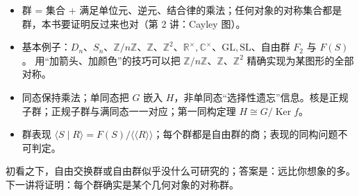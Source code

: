 \documentclass[11pt,a4paper]{article}
\theoremstyle{definition}
\theoremstyle{plain}
\theoremstyle{remark}
\newcommand{\Z}{\mathbb{Z}}
\newcommand{\R}{\mathbb{R}}
\newcommand{\C}{\mathbb{C}}
\newcommand{\GL}{\mathrm{GL}}
\newcommand{\SL}{\mathrm{SL}}
\DeclareMathOperator{\Ker}{Ker}
\begin{document}
\begin{summarybox}[本讲要点]
\begin{itemize}[nosep]
  \item 群 = 集合 + 满足单位元、逆元、结合律的乘法；任何对象的对称集合都是群，本书要证明反过来也对（第 2 讲：Cayley 图）。
  \item 基本例子：$D_n$、$S_n$、$\Z/n\Z$、$\Z$、$\Z^2$、$\R^\times,\C^\times$、$\GL,\SL$、自由群 $F_2$ 与 $F(S)$。
        用“加箭头、加颜色”的技巧可以把 $\Z/n\Z$、$\Z$、$\Z^2$ 精确实现为某图形的全部对称。
  \item 同态保持乘法；单同态把 $G$ 嵌入 $H$，非单同态“选择性遗忘”信息。核是正规子群；正规子群与满同态一一对应；第一同构定理 $H\cong G/\Ker f$。
  \item 群表现 $\langle S\mid R\rangle = F(S)/\langle\!\langle R\rangle\!\rangle$；每个群都是自由群的商；表现的同构问题不可判定。
\end{itemize}
\end{summarybox}

初看之下，自由交换群或自由群似乎没什么可研究的；答案是：远比你想象的多。
下一讲将证明：每个群确实是某个几何对象的对称群。
\end{document}
